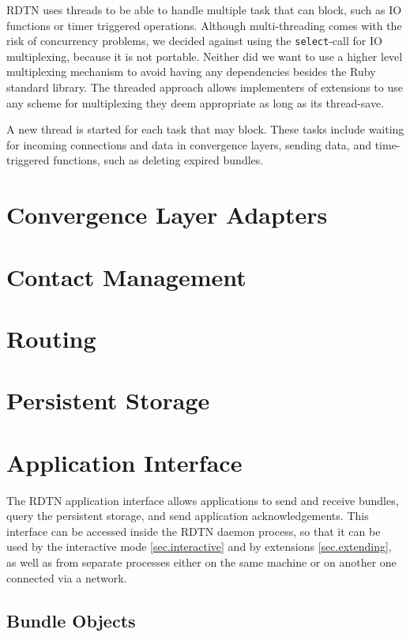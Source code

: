 \documentclass{article}
\begin{document}
RDTN uses threads to be able to handle multiple task that can block, such as IO
functions or timer triggered operations. Although multi-threading comes with the
risk of concurrency problems, we decided against using the {\tt select}-call for
IO multiplexing, because it is not portable. Neither did we want to use a higher
level multiplexing mechanism to avoid having any dependencies besides the Ruby
standard library. The threaded approach allows implementers of extensions to use
any scheme for multiplexing they deem appropriate as long as its thread-save.

A new thread is started for each task that may block. These tasks include
waiting for incoming connections and data in convergence layers, sending data,
and time-triggered functions, such as deleting expired bundles.

\section{Convergence Layer Adapters}\label{sec.cl}

\section{Contact Management}\label{sec.contact-mngt}

\section{Routing}\label{sec.routing}

\section{Persistent Storage}\label{sec.storage}

\section{Application Interface}\label{sec.appif}

The RDTN application interface allows applications to send and receive bundles,
query the persistent storage, and send application acknowledgements. This
interface can be accessed inside the RDTN daemon process, so that it can be used
by the interactive mode \ref{sec.interactive} and by extensions
\ref{sec.extending}, as well as from separate processes either on the same
machine or on another one connected via a network.

\subsection{Bundle Objects}\label{sec.bundle-obj}
\end{document}
